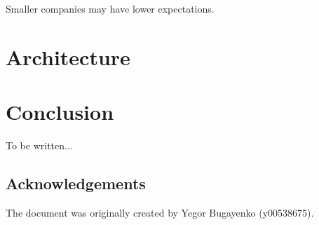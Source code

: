 \documentclass[12pt,oneside]{article}
\begin{document}
Smaller companies may have lower expectations.

\section{Architecture}



\section{Conclusion}
\label{sec:conclusion}

To be written...

\subsection{Acknowledgements}
\label{sec:ack}

The document was originally created by Yegor Bugayenko (y00538675).

\printbibliography%
\end{document}
